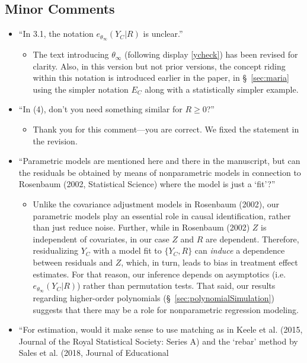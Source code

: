 \documentclass[12pt]{article}
\newcommand{\InfPar}[1]{\ensuremath{{#1}_{\infty}}}
\newcommand{\thetaInf}{\InfPar{\theta}}
\newcommand{\dt}[3][\theta]{\ensuremath{e_{#1}(#2| {#3})}}
\begin{document}
\subsection{Minor Comments}
\begin{itemize}
\item ``In 3.1, the notation $\dt[\thetaInf]{Y_{C}}{ R }$ is unclear.''
\begin{itemize}
  \item The text introducing $\thetaInf$ (following display
    \eqref{ycheck}) has been revised for clarity.  Also, in this
    version but not prior versions, the concept riding
    within this notation is introduced earlier in the paper, 
     in \S~\ref{sec:maria} using the simpler notation $E_{C}$ 
    along with a statistically simpler example.   
\end{itemize}
\item ``In (4), don’t you need something similar for $R\ge 0$?''
\begin{itemize}
 \item Thank you for this comment---you are correct. We fixed the
   statement in the revision.
 \end{itemize}
\item ``Parametric models are mentioned here and there in the
  manuscript, but can the residuals be obtained by means of
  nonparametric models in connection to Rosenbaum (2002, Statistical
  Science) where the model is just a `fit'?''
\begin{itemize}
 \item Unlike the covariance adjustment models in Rosenbaum (2002), our parametric models play an
   essential role in causal identification, rather than just reduce
   noise. Further, while in Rosenbaum (2002) $Z$ is independent of
   covariates, in our case $Z$ and $R$ are dependent. Therefore,
   residualizing $Y_C$ with a model fit to $\{Y_C,R\}$
   can \emph{induce} a dependence between residuals and $Z$, which, in turn, leads to
   bias in treatment effect estimates. For that reason, our inference
   depends on asymptotics (i.e. $\dt[\thetaInf]{Y_C}{R}$) rather than
   permutation tests. That said, our results regarding higher-order
   polynomials (\S~\ref{sec:polynomialSimulation}) suggests that there may be a role for nonparametric
   regression modeling.
\end{itemize}
\item ``For estimation, would it make sense to use matching as in Keele
  et al. (2015, Journal of the Royal Statistical Society: Series A)
  and the `rebar' method by Sales et al. (2018, Journal of Educational

\end{itemize}
\end{document}
